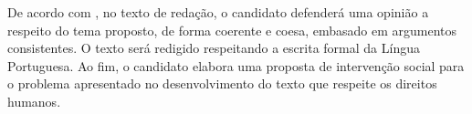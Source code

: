 \begin{longtable}{|c|l|l|}
\end{longtable}

De acordo com \cite{braga:2015}, no texto de redação, o candidato defenderá 
uma opinião a respeito do tema proposto, de forma coerente e coesa, embasado em 
argumentos consistentes. O texto será redigido respeitando a escrita formal da 
Língua Portuguesa. Ao fim, o candidato elabora uma proposta de intervenção 
social para o problema apresentado no desenvolvimento do texto que respeite os 
direitos humanos.

